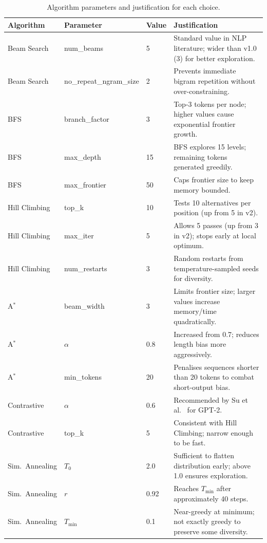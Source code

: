 \documentclass[12pt]{article}
\begin{document}
\begin{table}[H]
	\centering
	\caption{Algorithm parameters and justification for each choice.}
	\label{tab:params}
	\renewcommand{\arraystretch}{1.2}
	\small
	\begin{tabularx}{\linewidth}{l l l X}
		\toprule
		\textbf{Algorithm} & \textbf{Parameter} & \textbf{Value} & \textbf{Justification} \\
		\midrule
		Beam Search & num\_beams & 5 & Standard value in NLP literature; wider than v1.0 (3) for better exploration. \\
		Beam Search & no\_repeat\_ngram\_size & 2 & Prevents immediate bigram repetition without over-constraining. \\
		BFS & branch\_factor & 3 & Top-3 tokens per node; higher values cause exponential frontier growth. \\
		BFS & max\_depth & 15 & BFS explores 15 levels; remaining tokens generated greedily. \\
		BFS & max\_frontier & 50 & Caps frontier size to keep memory bounded. \\
		Hill Climbing & top\_k & 10 & Tests 10 alternatives per position (up from 5 in v2). \\
		Hill Climbing & max\_iter & 5 & Allows 5 passes (up from 3 in v2); stops early at local optimum. \\
		Hill Climbing & num\_restarts & 3 & Random restarts from temperature-sampled seeds for diversity. \\
		A$^*$ & beam\_width & 3 & Limits frontier size; larger values increase memory/time quadratically. \\
		A$^*$ & $\alpha$ & 0.8 & Increased from 0.7; reduces length bias more aggressively. \\
		A$^*$ & min\_tokens & 20 & Penalises sequences shorter than 20 tokens to combat short-output bias. \\
		Contrastive & $\alpha$ & 0.6 & Recommended by Su et al.~\cite{su2022contrastive} for GPT-2. \\
		Contrastive & top\_k & 5 & Consistent with Hill Climbing; narrow enough to be fast. \\
		Sim.\ Annealing & $T_0$ & 2.0 & Sufficient to flatten distribution early; above 1.0 ensures exploration. \\
		Sim.\ Annealing & $r$ & 0.92 & Reaches $T_{\min}$ after approximately 40 steps. \\
		Sim.\ Annealing & $T_{\min}$ & 0.1 & Near-greedy at minimum; not exactly greedy to preserve some diversity. \\
		\bottomrule
	\end{tabularx}
\end{table}
\end{document}
